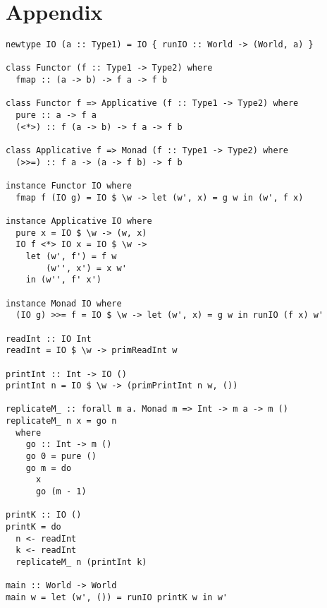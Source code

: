 \documentclass[runningheads]{llncs}
\begin{document}



\appendix

\section*{Appendix}

\begin{verbatim}
newtype IO (a :: Type1) = IO { runIO :: World -> (World, a) }

class Functor (f :: Type1 -> Type2) where
  fmap :: (a -> b) -> f a -> f b

class Functor f => Applicative (f :: Type1 -> Type2) where
  pure :: a -> f a
  (<*>) :: f (a -> b) -> f a -> f b

class Applicative f => Monad (f :: Type1 -> Type2) where
  (>>=) :: f a -> (a -> f b) -> f b

instance Functor IO where
  fmap f (IO g) = IO $ \w -> let (w', x) = g w in (w', f x)

instance Applicative IO where
  pure x = IO $ \w -> (w, x)
  IO f <*> IO x = IO $ \w ->
    let (w', f') = f w
        (w'', x') = x w'
    in (w'', f' x')

instance Monad IO where
  (IO g) >>= f = IO $ \w -> let (w', x) = g w in runIO (f x) w'

readInt :: IO Int
readInt = IO $ \w -> primReadInt w

printInt :: Int -> IO ()
printInt n = IO $ \w -> (primPrintInt n w, ())

replicateM_ :: forall m a. Monad m => Int -> m a -> m ()
replicateM_ n x = go n
  where
    go :: Int -> m ()
    go 0 = pure ()
    go m = do
      x
      go (m - 1)

printK :: IO ()
printK = do
  n <- readInt
  k <- readInt
  replicateM_ n (printInt k)

main :: World -> World
main w = let (w', ()) = runIO printK w in w'
\end{verbatim}
\end{document}

